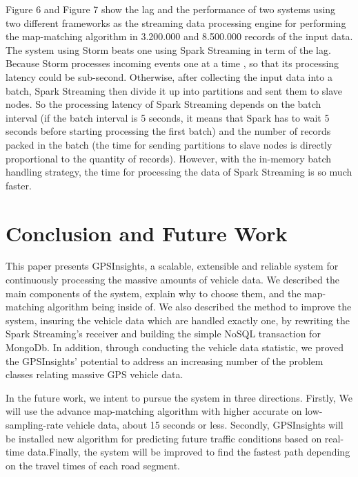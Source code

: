 \documentclass{acm_proc_article-sp}
\begin{document}
Figure 6 and Figure 7 show the lag and the performance of two systems using two different frameworks as the streaming data processing engine for performing the map-matching algorithm in 3.200.000 and 8.500.000 records of the input data. The system using Storm beats one using Spark Streaming in term of the lag. Because Storm processes incoming events one at a time , so that its processing latency could be sub-second. Otherwise, after collecting the input data into a batch, Spark Streaming then divide it up into partitions and sent them to slave nodes. So the processing latency of Spark Streaming depends on the batch interval (if the batch interval is 5 seconds, it means that Spark has to wait 5 seconds before starting processing the first batch)  and the number of records packed in the batch (the time for sending partitions to slave nodes is directly proportional to the quantity of records). However, with the in-memory batch handling strategy, the time for processing the data of Spark Streaming is so much faster.	
	

			
\section{Conclusion and Future Work}
This paper presents GPSInsights, a scalable, extensible and reliable system for continuously processing the massive amounts of vehicle data. We described the main components of the system, explain why to choose them, and the map-matching algorithm being inside of. We also described the method to improve the system, insuring the vehicle data which are handled exactly one, by rewriting the Spark Streaming's receiver and building the simple NoSQL transaction for MongoDb. In addition, through conducting the vehicle data statistic, we proved the GPSInsights' potential to address an increasing number of the problem classes relating massive GPS vehicle data.

In the future work, we intent to pursue the system in three directions. Firstly, We will use the advance map-matching algorithm with higher accurate on low-sampling-rate vehicle data, about 15 seconds or less. Secondly, GPSInsights will be installed new algorithm for predicting future traffic conditions based on real-time data.Finally, the system will be improved to find the fastest path depending on the travel times of each road segment.
%

%
%
\appendix

\balancecolumns
\end{document}
